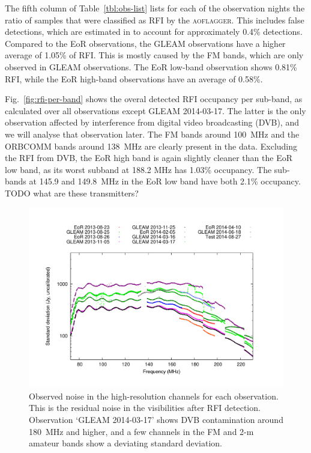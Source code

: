 \documentclass{pasa}
\begin{document}
The fifth column of Table~\ref{tbl:obs-list} lists for each of the observation nights the ratio of samples that were classified as RFI by the \textsc{aoflagger}. This includes false detections, which are estimated in \citet{lofar-radio-environment} to account for approximately 0.4\% detections. Compared to the EoR observations, the GLEAM observations have a higher average of 1.05\% of RFI. This is mostly caused by the FM bands, which are only observed in GLEAM observations. The EoR low-band observation shows 0.81\% RFI, while the EoR high-band observations have an average of 0.58\%.

Fig.~\ref{fig:rfi-per-band} shows the overal detected RFI occupancy per sub-band, as calculated over all observations except GLEAM 2014-03-17. The latter is the only observation affected by interference from digital video broadcasting (DVB), and we will analyse that observation later. The FM bands around 100~MHz and the ORBCOMM bands around 138~MHz are clearly present in the data. Excluding the RFI from DVB, the EoR high band is again slightly cleaner than the EoR low band, as its worst subband at 188.2 MHz has 1.03\% occupancy. The sub-bands at 145.9 and 149.8~MHz in the EoR low band have both 2.1\% occupancy. TODO what are these transmitters?

\noindent\begin{figure}
\begin{center}\hspace*{-0.2cm}\includegraphics[width=18cm]{img/plot-stddev-per-set}\vspace{-1cm}
\caption{Observed noise in the high-resolution channels for each observation. This is the residual noise in the visibilities after RFI detection. Observation `GLEAM 2014-03-17' shows DVB contamination around 180~MHz and higher, and a few channels in the FM and 2-m amateur bands show a deviating standard deviation.}
\label{fig:stddev-per-set}
\end{center}
\end{figure}
\end{document}
